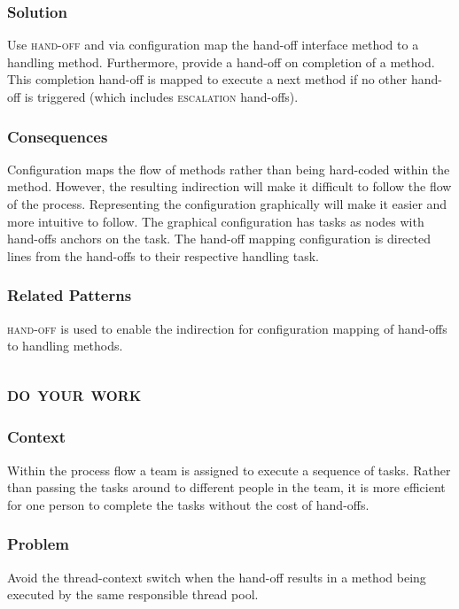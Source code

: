 \documentclass[prodmode]{style/acmlarge}
\begin{document}
\subsubsection*{Solution} Use \textsc{hand-off} and via configuration map the
hand-off interface method to a handling method.  Furthermore, provide a hand-off
on completion of a method.  This completion hand-off is mapped to execute a next
method if no other hand-off is triggered (which includes \textsc{escalation}
hand-offs).

\subsubsection*{Consequences} Configuration maps the flow of methods rather than
being hard-coded within the method.  However, the resulting indirection will
make it difficult to follow the flow of the process.  Representing the
configuration graphically will make it easier and more intuitive to follow.  The
graphical configuration has tasks as nodes with hand-offs anchors on the task. 
The hand-off mapping configuration is directed lines from the hand-offs to their
respective handling task.

\subsubsection*{Related Patterns} \textsc{hand-off} is used to enable the
indirection for configuration mapping of hand-offs to handling methods.




\subsection{\textsc{\textbf{do your work}}}

\subsubsection*{Context} Within the process flow a team is assigned to execute a
sequence of tasks. Rather than passing the tasks around to different people in
the team, it is more efficient for one person to complete the tasks without the
cost of hand-offs.

\subsubsection*{Problem} Avoid the thread-context switch when the hand-off
results in a method being executed by the same responsible thread pool.
\end{document}
